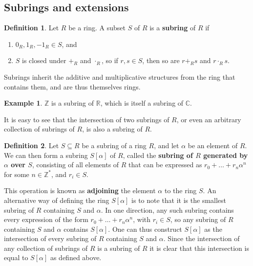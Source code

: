 \documentclass{article}
\newcommand{\Z}{\mathbb{Z}}
\newcommand{\R}{\mathbb{R}}
\newcommand{\C}{\mathbb{C}}
\renewcommand{\sb}[1]{\left[ #1 \right]}
\theoremstyle{definition}\newtheorem{definition}{Definition}[subsection]
\theoremstyle{definition}\newtheorem{remark}[definition]{Remark}
\theoremstyle{definition}\newtheorem*{example}{Example}
\theoremstyle{definition}\newtheorem*{note}{Note}
\begin{document}
\subsection{Subrings and extensions}

\begin{definition}
Let $ R $ be a ring. A subset $ S $ of $ R $ is a \textbf{subring} of $ R $ if
\begin{enumerate}
\item $ 0_R, 1_R, -1_R \in S $, and
\item $ S $ is closed under $ +_R $ and $ \cdot_R $, so if $ r, s \in S $, then so are $ r +_R s $ and $ r \cdot_R s $.
\end{enumerate}
\end{definition}

Subrings inherit the additive and multiplicative structures from the ring that contains them, and are thus themselves rings.

\begin{example}
$ \Z $ is a subring of $ \R $, which is itself a subring of $ \C $.
\end{example}

It is easy to see that the intersection of two subrings of $ R $, or even an arbitrary collection of subrings of $ R $, is also a subring of $ R $.

\begin{definition}
Let $ S \subseteq R $ be a subring of a ring $ R $, and let $ \alpha $ be an element of $ R $. We can then form a subring $ S\sb{\alpha} $ of $ R $, called the \textbf{subring of $ R $ generated by $ \alpha $ over $ S $}, consisting of all elements of $ R $ that can be expressed as $ r_0 + \dots + r_n\alpha^n $ for some $ n \in \Z^* $, and $ r_i \in S $.
\end{definition}

This operation is known as \textbf{adjoining} the element $ \alpha $ to the ring $ S $. An alternative way of defining the ring $ S\sb{\alpha} $ is to note that it is the smallest subring of $ R $ containing $ S $ and $ \alpha $. In one direction, any such subring contains every expression of the form $ r_0 + \dots + r_n\alpha^n $, with $ r_i \in S $, so any subring of $ R $ containing $ S $ and $ \alpha $ contains $ S\sb{\alpha} $. One can thus construct $ S\sb{\alpha} $ as the intersection of every subring of $ R $ containing $ S $ and $ \alpha $. Since the intersection of any collection of subrings of $ R $ is a subring of $ R $ it is clear that this intersection is equal to $ S\sb{\alpha} $ as defined above.
\end{document}
